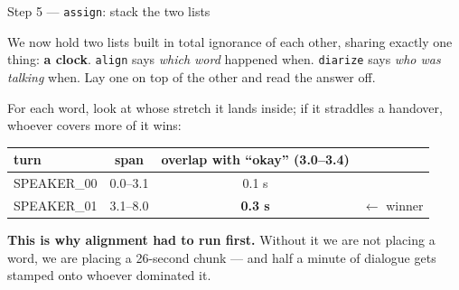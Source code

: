 \documentclass[aspectratio=169]{beamer}
\begin{document}
\begin{frame}{Step 5 --- \texttt{assign}: stack the two lists}

We now hold two lists built in total ignorance of each other, sharing exactly one thing:
\textbf{a clock}. \texttt{align} says \emph{which word} happened when. \texttt{diarize} says
\emph{who was talking} when. Lay one on top of the other and read the answer off.

For each word, look at whose stretch it lands inside; if it straddles a handover, whoever
covers more of it wins:

\begin{center}
\scriptsize
\begin{tabular}{lccl}
\toprule
turn & span & overlap with ``okay'' (3.0--3.4) & \\
\midrule
SPEAKER\_00 & 0.0--3.1 & 0.1 s & \\
SPEAKER\_01 & 3.1--8.0 & \textbf{0.3 s} & $\leftarrow$ winner \\
\bottomrule
\end{tabular}
\end{center}

\vspace{0.3em}
\textbf{This is why alignment had to run first.} Without it we are not placing a word, we
are placing a 26-second chunk --- and half a minute of dialogue gets stamped onto whoever
dominated it.

\end{frame}
\end{document}
